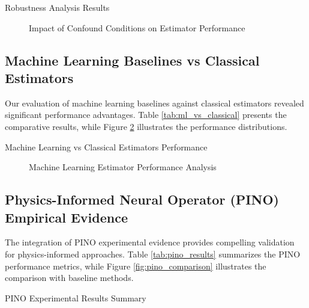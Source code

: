 \begin{table}[h]
\centering
\caption{Robustness Analysis Results}
\label{tab:robustness_analysis}
\end{table}

\begin{figure}[h]
\centering
\caption{Impact of Confound Conditions on Estimator Performance}
\label{fig:confound_impact}
\end{figure}

\subsection{Machine Learning Baselines vs Classical Estimators}

Our evaluation of machine learning baselines against classical estimators revealed significant performance advantages. Table \ref{tab:ml_vs_classical} presents the comparative results, while Figure \ref{fig:ml_performance} illustrates the performance distributions.

\begin{table}[h]
\centering
\caption{Machine Learning vs Classical Estimators Performance}
\label{tab:ml_vs_classical}
\end{table}

\begin{figure}[h]
\centering
\caption{Machine Learning Estimator Performance Analysis}
\label{fig:ml_performance}
\end{figure}

\subsection{Physics-Informed Neural Operator (PINO) Empirical Evidence}

The integration of PINO experimental evidence provides compelling validation for physics-informed approaches. Table \ref{tab:pino_results} summarizes the PINO performance metrics, while Figure \ref{fig:pino_comparison} illustrates the comparison with baseline methods.

\begin{table}[h]
\centering
\caption{PINO Experimental Results Summary}
\label{tab:pino_results}
\end{table}

